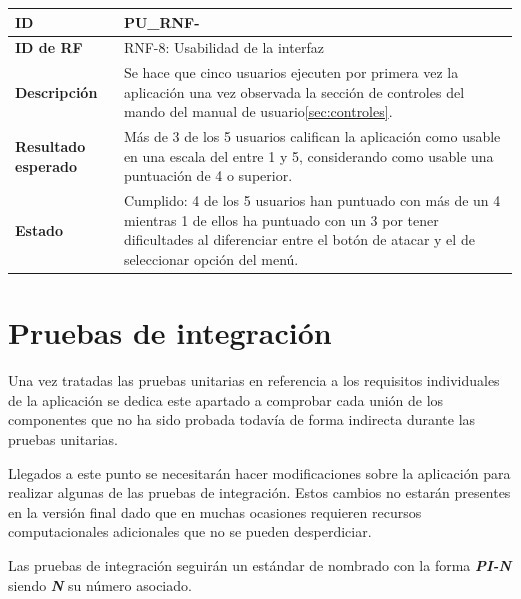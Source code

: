 \begin{center}
	\begin{tabular}{ | p{3cm} | p{10cm} | } 
		\hline
		
		\textbf{ID} & PU\_RNF-\arabic{contador_pruebas_no_funcionales}
		{contador_pruebas_no_funcionales} \\
		
		\hline 
		\textbf{ID de RF} &
		RNF-8: Usabilidad de la interfaz\\
		
		\hline
		\textbf{Descripción} & 
		Se hace que cinco usuarios ejecuten por primera vez la aplicación una vez observada la sección de controles del mando del manual de usuario\ref{sec:controles}.\\
		
		\hline 
		\textbf{Resultado esperado} &
		Más de 3 de los 5 usuarios califican la aplicación como usable en una escala del entre 1 y 5, considerando como usable una puntuación de 4 o superior.\\
		
		\hline 
		\textbf{Estado} &
		Cumplido: 4 de los 5 usuarios han puntuado con más de un 4 mientras 1 de ellos ha puntuado con un 3 por tener dificultades al diferenciar entre el botón de atacar y el de seleccionar opción del menú.\\ 
		
		\hline
	\end{tabular}
\end{center}


\section{Pruebas de integración}

Una vez tratadas las pruebas unitarias en referencia a los requisitos individuales de la aplicación se dedica este apartado a comprobar cada unión de los componentes que no ha sido probada todavía de forma indirecta durante las pruebas unitarias.

\bigskip

Llegados a este punto se necesitarán hacer modificaciones sobre la aplicación para realizar algunas de las pruebas de integración. Estos cambios no estarán presentes en la versión final dado que en muchas ocasiones requieren recursos computacionales adicionales que no se pueden desperdiciar.

\bigskip

Las pruebas de integración seguirán un estándar de nombrado con la forma \textbf{\textit{PI-N}} siendo \textbf{\textit{N}} su número asociado.


